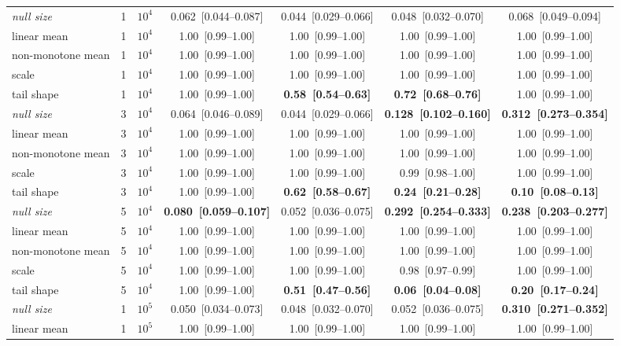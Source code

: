 {\begin{tabular}{llrcccc}
\midrule
\emph{null size} & 1 & $10^4$ & 0.062~[0.044--0.087] & 0.044~[0.029--0.066] & 0.048~[0.032--0.070] & 0.068~[0.049--0.094] \\
linear mean & 1 & $10^4$ & 1.00~[0.99--1.00] & 1.00~[0.99--1.00] & 1.00~[0.99--1.00] & 1.00~[0.99--1.00] \\
non-monotone mean & 1 & $10^4$ & 1.00~[0.99--1.00] & 1.00~[0.99--1.00] & 1.00~[0.99--1.00] & 1.00~[0.99--1.00] \\
scale & 1 & $10^4$ & 1.00~[0.99--1.00] & 1.00~[0.99--1.00] & 1.00~[0.99--1.00] & 1.00~[0.99--1.00] \\
tail shape & 1 & $10^4$ & 1.00~[0.99--1.00] & \textbf{0.58~[0.54--0.63]} & \textbf{0.72~[0.68--0.76]} & 1.00~[0.99--1.00] \\
\midrule
\emph{null size} & 3 & $10^4$ & 0.064~[0.046--0.089] & 0.044~[0.029--0.066] & \textbf{0.128~[0.102--0.160]} & \textbf{0.312~[0.273--0.354]} \\
linear mean & 3 & $10^4$ & 1.00~[0.99--1.00] & 1.00~[0.99--1.00] & 1.00~[0.99--1.00] & 1.00~[0.99--1.00] \\
non-monotone mean & 3 & $10^4$ & 1.00~[0.99--1.00] & 1.00~[0.99--1.00] & 1.00~[0.99--1.00] & 1.00~[0.99--1.00] \\
scale & 3 & $10^4$ & 1.00~[0.99--1.00] & 1.00~[0.99--1.00] & 0.99~[0.98--1.00] & 1.00~[0.99--1.00] \\
tail shape & 3 & $10^4$ & 1.00~[0.99--1.00] & \textbf{0.62~[0.58--0.67]} & \textbf{0.24~[0.21--0.28]} & \textbf{0.10~[0.08--0.13]} \\
\midrule
\emph{null size} & 5 & $10^4$ & \textbf{0.080~[0.059--0.107]} & 0.052~[0.036--0.075] & \textbf{0.292~[0.254--0.333]} & \textbf{0.238~[0.203--0.277]} \\
linear mean & 5 & $10^4$ & 1.00~[0.99--1.00] & 1.00~[0.99--1.00] & 1.00~[0.99--1.00] & 1.00~[0.99--1.00] \\
non-monotone mean & 5 & $10^4$ & 1.00~[0.99--1.00] & 1.00~[0.99--1.00] & 1.00~[0.99--1.00] & 1.00~[0.99--1.00] \\
scale & 5 & $10^4$ & 1.00~[0.99--1.00] & 1.00~[0.99--1.00] & 0.98~[0.97--0.99] & 1.00~[0.99--1.00] \\
tail shape & 5 & $10^4$ & 1.00~[0.99--1.00] & \textbf{0.51~[0.47--0.56]} & \textbf{0.06~[0.04--0.08]} & \textbf{0.20~[0.17--0.24]} \\
\midrule
\emph{null size} & 1 & $10^5$ & 0.050~[0.034--0.073] & 0.048~[0.032--0.070] & 0.052~[0.036--0.075] & \textbf{0.310~[0.271--0.352]} \\
linear mean & 1 & $10^5$ & 1.00~[0.99--1.00] & 1.00~[0.99--1.00] & 1.00~[0.99--1.00] & 1.00~[0.99--1.00] \\

\end{tabular}}

